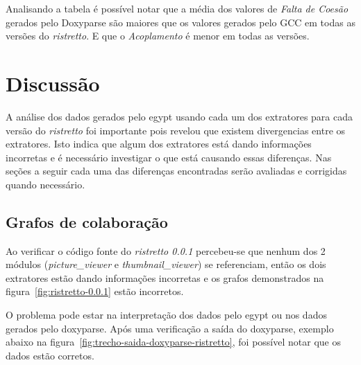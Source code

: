 Analisando a tabela é possível notar que a média dos valores de {\it Falta de
Coesão} gerados pelo Doxyparse são maiores que os valores gerados pelo GCC em
todas as versões do {\it ristretto}. E que o {\it Acoplamento} é menor em todas
as versões.

\section{Discussão} \label{sec:discussao}

A análise dos dados gerados pelo egypt usando cada um dos extratores para cada
versão do {\it ristretto} foi importante pois revelou que existem divergencias
entre os extratores. Isto indica que algum dos extratores está dando
informações incorretas e é necessário investigar o que está causando essas
diferenças. Nas seções a seguir cada uma das diferenças encontradas serão
avaliadas e corrigidas quando necessário.

\subsection{Grafos de colaboração}

Ao verificar o código fonte do {\it ristretto 0.0.1} percebeu-se que nenhum dos
2 módulos ({\it picture\_viewer} e {\it thumbnail\_viewer}) se referenciam,
então os dois extratores estão dando informações incorretas e os grafos
demonstrados na figura~\ref{fig:ristretto-0.0.1} estão incorretos.

O problema pode estar na interpretação dos dados pelo egypt ou nos dados
gerados pelo doxyparse. Após uma verificação a saída do doxyparse, exemplo
abaixo na figura~\ref{fig:trecho-saida-doxyparse-ristretto}, foi possível notar
que os dados estão corretos.

